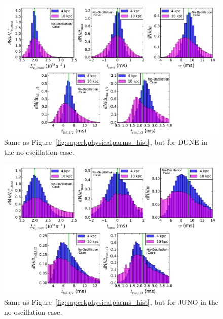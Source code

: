 
\begin{figure}[h]
\centerline{\includegraphics[width=0.943\linewidth]{wh07_15_40g_DUNE_realparameters_histogram.pdf}}
\caption{\label{fig:dunephysicalparms_hist} Same as
  Figure~\ref{fig:superkphysicalparms_hist}, but for DUNE in the
  no-oscillation case.}
\end{figure}


\begin{figure}[h]
\centerline{\includegraphics[width=0.943\linewidth]{wh07_15_40g_JUNO_realparameters_histogram.pdf}}
\caption{\label{fig:junophysicalparms_hist} Same as
  Figure~\ref{fig:superkphysicalparms_hist}, but for JUNO in the
  no-oscillation case.}
\end{figure}


